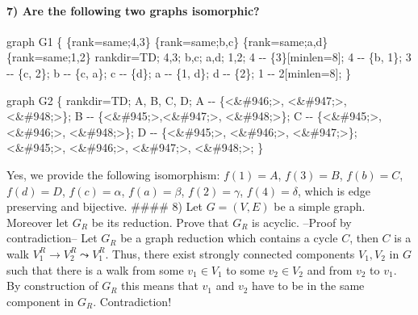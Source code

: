 \documentclass[
]{article}
\newenvironment{Shaded}{}{}
\newcommand{\NormalTok}[1]{#1}
\begin{document}
\hypertarget{are-the-following-two-graphs-isomorphic}{%
\paragraph{7) Are the following two graphs
isomorphic?}\label{are-the-following-two-graphs-isomorphic}}

\begin{Shaded}
\begin{Highlighting}[]
\NormalTok{graph G1 \{ }
\NormalTok{    \{rank=same;4,3\}}
\NormalTok{    \{rank=same;b,c\}}
\NormalTok{    \{rank=same;a,d\}}
\NormalTok{    \{rank=same;1,2\}}
\NormalTok{    rankdir=TD;}
\NormalTok{    4,3;}
\NormalTok{    b,c;}
\NormalTok{    a,d;}
\NormalTok{    1,2;}
\NormalTok{        4 {-}{-} \{3\}[minlen=8];}
\NormalTok{        4 {-}{-} \{b, 1\};}
\NormalTok{        3 {-}{-} \{c, 2\};}
\NormalTok{            b {-}{-} \{c, a\}; }
\NormalTok{            c {-}{-} \{d\};}
\NormalTok{            a {-}{-} \{1, d\};}
\NormalTok{            d {-}{-} \{2\};}
\NormalTok{        1 {-}{-} 2[minlen=8];}
\NormalTok{    \}}
\end{Highlighting}
\end{Shaded}

\begin{Shaded}
\begin{Highlighting}[]
\NormalTok{graph G2 \{ }
\NormalTok{    rankdir=TD;}
\NormalTok{        A, B, C, D;}
\NormalTok{        A {-}{-} \{\textless{}\&\#946;\textgreater{}, \textless{}\&\#947;\textgreater{}, \textless{}\&\#948;\textgreater{}\};}
\NormalTok{        B {-}{-} \{\textless{}\&\#945;\textgreater{},\textless{}\&\#947;\textgreater{}, \textless{}\&\#948;\textgreater{}\};}
\NormalTok{        C {-}{-} \{\textless{}\&\#945;\textgreater{}, \textless{}\&\#946;\textgreater{}, \textless{}\&\#948;\textgreater{}\};}
\NormalTok{        D {-}{-} \{\textless{}\&\#945;\textgreater{}, \textless{}\&\#946;\textgreater{}, \textless{}\&\#947;\textgreater{}\};}
\NormalTok{        \textless{}\&\#945;\textgreater{}, \textless{}\&\#946;\textgreater{}, \textless{}\&\#947;\textgreater{}, \textless{}\&\#948;\textgreater{};}
\NormalTok{    \}}
\end{Highlighting}
\end{Shaded}

Yes, we provide the following isomorphism: \(f(1) = A\), \(f(3) = B\),
\(f(b) = C\), \(f(d) = D\), \(f(c) = \alpha\), \(f(a) = \beta\),
\(f(2) = \gamma\), \(f(4) = \delta\), which is edge preserving and
bijective. \#\#\#\# 8) Let \(G = (V,E)\) be a simple graph. Moreover let
\(G_R\) be its reduction. Prove that \(G_R\) is acyclic. --Proof by
contradiction-- Let \(G_R\) be a graph reduction which contains a cycle
\(C\), then \(C\) is a walk \(V_1^R \rightarrow V_2^R \leadsto V_1^R\).
Thus, there exist strongly connected components \(V_1, V_2\) in \(G\)
such that there is a walk from some \(v_1 \in V_1\) to some
\(v_2 \in V_2\) and from \(v_2\) to \(v_1\). By construction of \(G_R\)
this means that \(v_1\) and \(v_2\) have to be in the same component in
\(G_R\). Contradiction!
\end{document}
